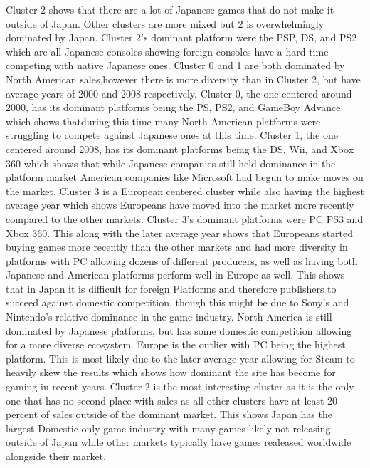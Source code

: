 \documentclass[conference]{IEEEtran}
\begin{document}
Cluster 2 shows that there are  a lot of Japanese games that do not make it outside of Japan. Other clusters are more mixed but 2 is overwhelmingly dominated by Japan. Cluster 2's dominant platform were the PSP, DS, and PS2 which are all Japanese consoles showing foreign consoles have a hard time competing with native Japanese ones. Cluster 0 and 1 are both dominated by North American sales,however there is more diversity than in Cluster 2, but have average years of 2000 and 2008 respectively. Cluster 0, the one centered around 2000, has its dominant platforms being the PS, PS2, and GameBoy Advance which shows thatduring this time many North American platforms were struggling to compete against Japanese ones at this time. Cluster 1, the one centered around 2008, has its dominant platforms being the DS, Wii, and Xbox 360 which shows that while Japanese companies still held dominance in the platform market American companies like Microsoft had begun to make moves on the market. Cluster 3 is a European centered cluster while also having the highest average year which shows Europeans have moved into the market more recently compared to the other markets. Cluster 3's dominant platforms were PC PS3 and Xbox 360. This along with the later average year shows that Europeans started buying games more recently than the other markets and had more diversity in platforms with PC allowing dozens of different producers, as well as having both Japanese and American platforms perform well in Europe as well. This shows that in Japan it is difficult for foreign Platforms and therefore publishers to succeed against domestic competition, though this might be due to Sony's and Nintendo's relative dominance in the game industry. North America is still dominated by Japanese platforms, but has some domestic competition allowing for a more diverse ecosystem. Europe is the outlier with PC being the highest platform. This is most likely due to the later average year allowing for Steam to heavily skew the results which shows how dominant the site has become for gaming in recent years. Cluster 2 is the most interesting cluster as it is the only one that has no second place with sales as all other clusters have at least 20 percent of sales outside of the dominant market. This shows Japan has the largest Domestic only game industry with many games likely not releasing outside of Japan while other markets typically have games realeased worldwide alongside their market.
\end{document}
